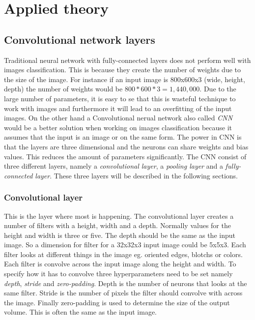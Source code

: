 \chapter{Applied theory}
\label{chp:theory}

\section{Convolutional network layers}
Traditional neural network with fully-connected layers does not perform well with images classification. This is because they create the number of weights due to the size of the image. For instance if an input image is 800x600x3 (wide, height, depth) the number of weights would be $800 * 600 * 3 = 1,440,000$. Due to the large number of parameters, it is easy to se that this is wasteful technique to work with images and furthermore it will lead to an overfitting of the input images. On the other hand a
Convolutional nerual network also called \emph{CNN} would be a better solution when working on images classification because it assumes that the input is an image or on the same form. The power in CNN is that the layers are three dimensional and the neurons can share weights and bias values. This reduces the amount of parameters significantly. The CNN consist of three different layers, namely a \emph{convolutional layer}, a \emph{pooling layer} and a \emph{fully-connected layer}. These three layers will be described in the following sections.

\subsection{Convolutional layer}
This is the layer where most is happening. The convolutional layer creates a number of filters with a height, width and a depth. Normally values for the height and width is three or five. The depth should be the same as the input image. So a dimension for filter for a 32x32x3 input image could be 5x5x3. Each filter looks at different things in the image eg. oriented edges, blotchs or colors. Each filter is convolve across the input image along the height and width. To specify how it has to convolve three hyperparameters need to be set namely \emph{depth}, \emph{stride} and \emph{zero-padding}. Depth is the number of neurons that looks at the same filter. Stride is the number of pixels the filter should convolve with across the image. Finally zero-padding is used to determine the size of the output volume. This is often the same as the input image. 

